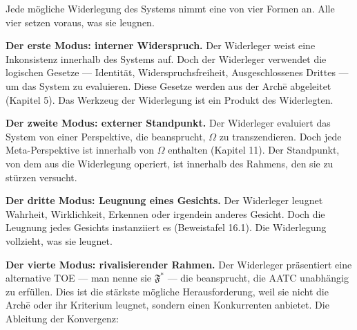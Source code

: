 \documentclass[10pt, openany, oneside]{book}
\begin{document}
\noindent Jede mögliche Widerlegung des Systems nimmt eine von vier Formen an. Alle vier setzen voraus, was sie leugnen.

\textbf{Der erste Modus: interner Widerspruch.} Der Widerleger weist eine Inkonsistenz innerhalb des Systems auf. Doch der Widerleger verwendet die logischen Gesetze --- Identität, Widerspruchsfreiheit, Ausgeschlossenes Drittes --- um das System zu evaluieren. Diese Gesetze werden aus der Arch\={e} abgeleitet (Kapitel 5). Das Werkzeug der Widerlegung ist ein Produkt des Widerlegten.

\textbf{Der zweite Modus: externer Standpunkt.} Der Widerleger evaluiert das System von einer Perspektive, die beansprucht, $\Omega$ zu transzendieren. Doch jede Meta-Perspektive ist innerhalb von $\Omega$ enthalten (Kapitel 11). Der Standpunkt, von dem aus die Widerlegung operiert, ist innerhalb des Rahmens, den sie zu stürzen versucht.

\textbf{Der dritte Modus: Leugnung eines Gesichts.} Der Widerleger leugnet Wahrheit, Wirklichkeit, Erkennen oder irgendein anderes Gesicht. Doch die Leugnung jedes Gesichts instanziiert es (Beweistafel 16.1). Die Widerlegung vollzieht, was sie leugnet.

\textbf{Der vierte Modus: rivalisierender Rahmen.} Der Widerleger präsentiert eine alternative TOE --- man nenne sie $\mathfrak{F}^*$ --- die beansprucht, die AATC unabhängig zu erfüllen. Dies ist die stärkste mögliche Herausforderung, weil sie nicht die Arch\={e} oder ihr Kriterium leugnet, sondern einen Konkurrenten anbietet. Die Ableitung der Konvergenz:

\vspace{0.5em}
\end{document}
